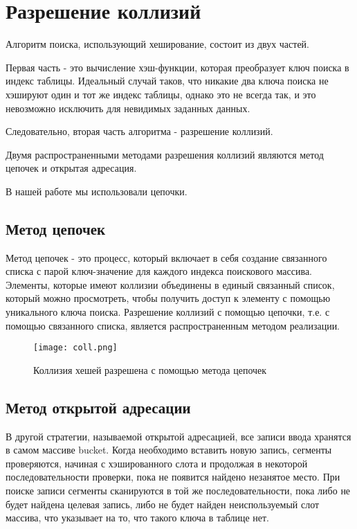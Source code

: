 \section{Разрешение коллизий}

Алгоритм поиска, использующий хеширование, состоит из двух частей. 

Первая часть - это вычисление хэш-функции, которая преобразует ключ поиска в индекс таблицы. 
Идеальный случай таков, что никакие два ключа поиска не хэшируют один и тот же индекс таблицы, однако это не всегда так, и это невозможно исключить для невидимых заданных данных. 

Следовательно, вторая часть алгоритма - разрешение коллизий. 

Двумя распространенными методами разрешения коллизий являются метод цепочек и открытая адресация.

В нашей работе мы использовали цепочки.

\subsection{Метод цепочек}

Метод цепочек - это процесс, который включает в себя создание связанного списка с парой ключ-значение для каждого индекса поискового массива. 
Элементы, которые имеют коллизии объединены в единый связанный список, который можно просмотреть, чтобы получить доступ к элементу с помощью уникального ключа поиска. 
Разрешение коллизий с помощью цепочки, т.е. с помощью связанного списка, является распространенным методом реализации.

\begin{figure}[H]
	\begin{center}
		\texttt{[image: coll.png]}
		\caption{Коллизия хешей разрешена с помощью метода цепочек}
	\end{center}
\end{figure}

\subsection{Метод открытой адресации}

В другой стратегии, называемой открытой адресацией, все записи ввода хранятся в самом массиве bucket.
Когда необходимо вставить новую запись, сегменты проверяются, начиная с хэшированного слота и продолжая в некоторой последовательности проверки, пока не появится найдено незанятое место.
При поиске записи сегменты сканируются в той же последовательности, пока либо не будет найдена целевая запись, либо не будет найден неиспользуемый слот массива, что указывает на то, что такого ключа в таблице нет.

